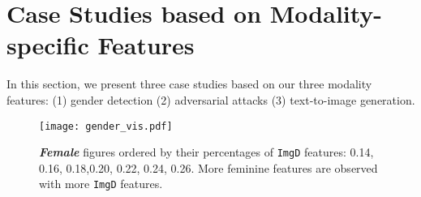 \section{Case Studies based on Modality-specific Features}
In this section, we present three case studies based on our three modality features: (1) gender detection (2) adversarial attacks (3) text-to-image generation.

\begin{figure*}[t]
    \centering
    \texttt{[image: gender\_vis.pdf]}
    \caption{\footnotesize \textit{\textbf{Female}} figures ordered by their percentages of \texttt{ImgD} features: 0.14, 0.16, 0.18,0.20, 0.22, 0.24, 0.26. More feminine features are observed with more \texttt{ImgD} features.}
\label{fig:female_diff_imgd}
\end{figure*}
